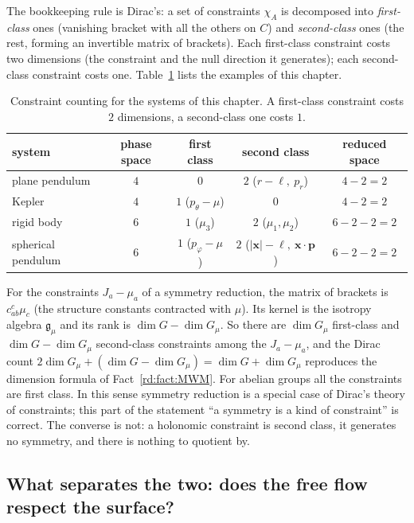 The bookkeeping rule is Dirac's: a set of constraints $\chi_A$ is decomposed into \emph{first-class} ones (vanishing bracket with all the others on $C$) and \emph{second-class} ones (the rest, forming an invertible matrix of brackets). Each first-class constraint costs two dimensions (the constraint and the null direction it generates); each second-class constraint costs one. Table~\ref{rd:tab:count} lists the examples of this chapter.

\begin{table}[ht]
\centering
\begin{tabular}{l|c|c|c|c}
system & phase space & first class & second class & reduced space\\ \hline
plane pendulum & $4$ & $0$ & $2$ \;($r-\ell,\ p_r$) & $4-2=2$\\
Kepler & $4$ & $1$ \;($p_\theta-\mu$) & $0$ & $4-2=2$\\
rigid body & $6$ & $1$ \;($\mu_3$) & $2$ \;($\mu_1,\mu_2$) & $6-2-2=2$\\
spherical pendulum & $6$ & $1$ \;($p_\varphi-\mu$) & $2$ \;($|\mathbf x|-\ell,\ \mathbf x\!\cdot\!\mathbf p$) & $6-2-2=2$
\end{tabular}
\caption{Constraint counting for the systems of this chapter. A first-class constraint costs $2$ dimensions, a second-class one costs $1$.}\label{rd:tab:count}
\end{table}

For the constraints $J_a-\mu_a$ of a symmetry reduction, the matrix of brackets is $c^c_{ab}\mu_c$ (the structure constants contracted with $\mu$). Its kernel is the isotropy algebra $\mathfrak g_\mu$ and its rank is $\dim G-\dim G_\mu$. So there are $\dim G_\mu$ first-class and $\dim G-\dim G_\mu$ second-class constraints among the $J_a-\mu_a$, and the Dirac count $2\dim G_\mu+(\dim G-\dim G_\mu)=\dim G+\dim G_\mu$ reproduces the dimension formula of Fact~\ref{rd:fact:MWM}. For abelian groups all the constraints are first class. In this sense symmetry reduction is a special case of Dirac's theory of constraints; this part of the statement ``a symmetry is a kind of constraint'' is correct. The converse is not: a holonomic constraint is second class, it generates no symmetry, and there is nothing to quotient by.

\subsection{What separates the two: does the free flow respect the surface?}\label{rd:sec:consist}

